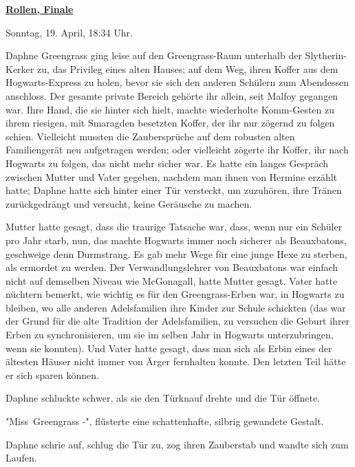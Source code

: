

\hypertarget{rollen-finale}{%

\textbf{\uline{Rollen, Finale}}

Sonntag, 19. April, 18:34 Uhr.

Daphne Greengrass ging leise auf den Greengrass-Raum unterhalb der Slytherin-Kerker zu, das Privileg eines alten Hauses; auf dem Weg, ihren Koffer aus dem Hogwarts-Express zu holen, bevor sie sich den anderen Schülern zum Abendessen anschloss. Der gesamte private Bereich gehörte ihr allein, seit Malfoy gegangen war. Ihre Hand, die sie hinter sich hielt, machte wiederholte Komm-Gesten zu ihrem riesigen, mit Smaragden besetzten Koffer, der ihr nur zögernd zu folgen schien. Vielleicht mussten die Zaubersprüche auf dem robusten alten Familiengerät neu aufgetragen werden; oder vielleicht zögerte ihr Koffer, ihr nach Hogwarts zu folgen, das nicht mehr sicher war. Es hatte ein langes Gespräch zwischen Mutter und Vater gegeben, nachdem man ihnen von Hermine erzählt hatte; Daphne hatte sich hinter einer Tür versteckt, um zuzuhören, ihre Tränen zurückgedrängt und versucht, keine Geräusche zu machen.

Mutter hatte gesagt, dass die traurige Tatsache war, dass, wenn nur ein Schüler pro Jahr starb, nun, das machte Hogwarts immer noch sicherer als Beauxbatons, geschweige denn Durmstrang. Es gab mehr Wege für eine junge Hexe zu sterben, als ermordet zu werden. Der Verwandlungslehrer von Beauxbatons war einfach nicht auf demselben Niveau wie McGonagall, hatte Mutter gesagt. Vater hatte nüchtern bemerkt, wie wichtig es für den Greengrass-Erben war, in Hogwarts zu bleiben, wo alle anderen Adelsfamilien ihre Kinder zur Schule schickten (das war der Grund für die alte Tradition der Adelsfamilien, zu versuchen die Geburt ihrer Erben zu synchronisieren, um sie im selben Jahr in Hogwarts unterzubringen, wenn sie konnten). Und Vater hatte gesagt, dass man sich als Erbin eines der ältesten Häuser nicht immer von Ärger fernhalten konnte. Den letzten Teil hätte er sich sparen können.

Daphne schluckte schwer, als sie den Türknauf drehte und die Tür öffnete.

"Miss~Greengrass -", flüsterte eine schattenhafte, silbrig gewandete Gestalt.

Daphne schrie auf, schlug die Tür zu, zog ihren Zauberstab und wandte sich zum Laufen.

}
